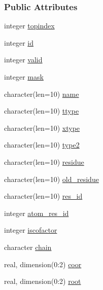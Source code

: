 \subsubsection*{Public Attributes}
\begin{DoxyCompactItemize}
\item 
integer \hyperlink{structcalc__xscore_1_1txatom_ab558e47add04cd5b58f680d9a17ebb97}{topindex}
\item 
integer \hyperlink{structcalc__xscore_1_1txatom_a7fa156d0892fc20199313888692fd64e}{id}
\item 
integer \hyperlink{structcalc__xscore_1_1txatom_ae5a4b038ba33facfd03a4bc74136cbcc}{valid}
\item 
integer \hyperlink{structcalc__xscore_1_1txatom_ae81b72073602b29f79360eb508642efa}{mask}
\item 
character(len=10) \hyperlink{structcalc__xscore_1_1txatom_a6e587d40405bc393476bb6800d7dd43c}{name}
\item 
character(len=10) \hyperlink{structcalc__xscore_1_1txatom_ad16524296088db4416e729609003a7f1}{ttype}
\item 
character(len=10) \hyperlink{structcalc__xscore_1_1txatom_a926309293c7f104d3d91626293003e2c}{xtype}
\item 
character(len=10) \hyperlink{structcalc__xscore_1_1txatom_ab4f28d56d2cd47dfafe28c61a2effbef}{type2}
\item 
character(len=10) \hyperlink{structcalc__xscore_1_1txatom_a719ac81e8984161ca3fc13bd061edd38}{residue}
\item 
character(len=10) \hyperlink{structcalc__xscore_1_1txatom_a2c94dcbe2026d4027020265ce2dab0ad}{old\-\_\-residue}
\item 
character(len=10) \hyperlink{structcalc__xscore_1_1txatom_a28e970dac2532184db1dae189f8d2b6c}{res\-\_\-id}
\item 
integer \hyperlink{structcalc__xscore_1_1txatom_a79b0712d5706daa5474d7b2fc5a9c598}{atom\-\_\-res\-\_\-id}
\item 
integer \hyperlink{structcalc__xscore_1_1txatom_a069eee3ac3ddc98f5d1a8498f0334557}{iscofactor}
\item 
character \hyperlink{structcalc__xscore_1_1txatom_a6e7ba5ff666dd90e69029603c3426319}{chain}
\item 
real, dimension(0\-:2) \hyperlink{structcalc__xscore_1_1txatom_a1745602201a14c33bdbe33623ada958a}{coor}
\item 
real, dimension(0\-:2) \hyperlink{structcalc__xscore_1_1txatom_ab4ac081f24d01657e4400a3969d6c90e}{root}
\item 

\end{DoxyCompactItemize}
